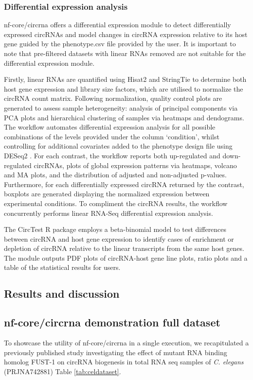 \subsubsection{Differential expression analysis}
nf-core/circrna offers a differential expression module to detect differentially expressed circRNAs and model changes in circRNA expression relative to its host gene guided by the phenotype.csv file provided by the user. It is important to note that pre-filtered datasets with linear RNAs removed are not suitable for the differential expression module. \par Firstly, linear RNAs are quantified using Hisat2 and StringTie \cite{Pertea2016} to determine both host gene expression and library size factors, which are utilised to normalize the circRNA count matrix. Following normalization, quality control plots are generated to assess sample heterogeneity: analysis of principal components via PCA plots and hierarchical clustering of samples via heatmaps and dendograms. The workflow automates differential expression analysis for all possible combinations of the levels provided under the column `condition', whilst controlling for additional covariates added to the phenotype design file using DESeq2 \cite{Love2014Dec}. For each contrast, the workflow reports both up-regulated and down-regulated circRNAs, plots of global expression patterns via heatmaps, volcano and MA plots, and the distribution of adjusted and non-adjusted p-values. Furthermore, for each differentially expressed circRNA returned by the contrast, boxplots are generated displaying the normalized expression between experimental conditions. To compliment the circRNA results, the workflow concurrently performs linear RNA-Seq differential expression analysis. \par
The CircTest \cite{DCC} R package employs a beta-binomial model to test differences between circRNA and host gene expression to identify cases of enrichment or depletion of circRNA relative to the linear transcripts from the same host genes. The module outputs PDF plots of circRNA-host gene line plots, ratio plots and a table of the statistical results for users.

\subsection{Results and discussion}
\subsection*{nf-core/circrna demonstration full dataset}
To showcase the utility of nf-core/circrna in a single execution, we recapitulated a previously published study investigating the effect of mutant RNA binding homolog FUST-1 on circRNA biogenesis in total RNA seq samples of \textit{C. elegans} (PRJNA742881) \cite{Cao2021} Table \ref{tab:celdataset}. \par

